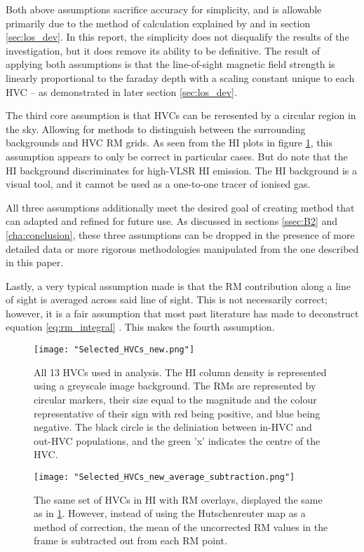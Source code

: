 Both above assumptions sacrifice accuracy for simplicity, and is allowable primarily due to the method of calculation explained by \cite{ID27} and in section \ref{sec:los_dev}. In this report, the simplicity does not disqualify the results of the investigation, but it does remove its ability to be definitive. The result of applying both assumptions is that the line-of-sight magnetic field strength is linearly proportional to the faraday depth with a scaling constant unique to each HVC – as demonstrated in later section \ref{sec:los_dev}.


The third core assumption is that HVCs can be reresented by a circular region in the sky. Allowing for methods to distinguish between the surrounding backgrounds and HVC RM grids. As seen from the HI plots in figure \ref{fig:all_hvcs}, this assumption appears to only be correct in particular cases. But do note that the HI background discriminates for high-VLSR HI emission. The HI background is a visual tool, and it cannot be used as a one-to-one tracer of ionised gas.


All three assumptions additionally meet the desired goal of creating method that can adapted and refined for future use. As discussed in sections \ref{ssec:B2} and \ref{cha:conclusion}, these three assumptions can be dropped in the presence of more detailed data or more rigorous methodologies manipulated from the one described in this paper.


Lastly, a very typical assumption made is that the RM contribution along a line of sight is averaged across said line of sight. This is not necessarily correct; however, it is a fair assumption that most past literature has made to deconstruct equation \ref{eq:rm_integral} \citep{ID27, ID3, ID26}. This makes the fourth assumption.

\begin{figure}
    \texttt{[image: "Selected\_HVCs\_new.png"]}
    \centering
    \caption{All 13 HVCs used in analysis. The HI column density is represented using a greyscale image background. The RMs are represented by circular markers, their size equal to the magnitude and the colour representative of their sign with red being positive, and blue being negative. The black circle is the deliniation between in-HVC and out-HVC populations, and the green 'x' indicates the centre of the HVC.}
    \label{fig:all_hvcs}
\end{figure}

\begin{figure}
    \texttt{[image: "Selected\_HVCs\_new\_average\_subtraction.png"]}
    \centering
    \caption{The same set of HVCs in HI with RM overlays, displayed the same as in \ref{fig:all_hvcs}. However, instead of using the Hutschenreuter map as a method of correction, the mean of the uncorrected RM values in the frame is subtracted out from each RM point.}
    \label{fig:all_hvcs_avg}
\end{figure}

